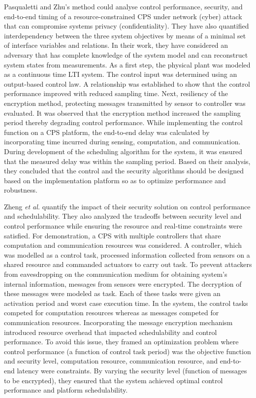 Pasqualetti and Zhu's \cite{PZ15} method could analyse control performance, security, and end-to-end timing of a resource-constrained CPS under network (cyber) attack that can compromise systems privacy (confidentiality). They have also quantified interdependency between the three system objectives by means of a minimal set of interface variables and relations. In their work, they have considered an adversary that has complete knowledge of the system model and can reconstruct system states from measurements. As a first step, the physical plant was modeled as a continuous time LTI system. The control input was determined using an output-based control law. A relationship was established to show that the control performance improved with reduced sampling time. Next, resiliency of the encryption method, protecting messages transmitted by sensor to controller was evaluated. It was observed that the encryption method increased the sampling period thereby degrading control performance. While implementing the control function on a CPS platform, the end-to-end delay was calculated by incorporating time incurred during sensing, computation, and communication. During development of the scheduling algorithm for the system, it was ensured that the measured delay was within the sampling period. Based on their analysis, they concluded that the control and the security algorithms should be designed based on the implementation platform so as to optimize performance and robustness. 

Zheng \textit{et al.} \cite{ZDRP16} quantify the impact of their security solution on control performance and schedulability. They also analyzed the tradeoffs between security level and control performance while ensuring the resource and real-time constraints were satisfied. For demonstration, a CPS with multiple controllers that share computation and communication resources was considered. A controller, which was modelled as a control task, processed information collected from sensors on a shared resource and commanded actuators to carry out task. To prevent attackers from eavesdropping on the communication medium for obtaining system's internal information, messages from sensors were encrypted. The decryption of these messages were modeled as task. Each of these tasks were given an activation period and worst case execution time. In the system, the control tasks competed for computation resources whereas as messages competed for communication resources. Incorporating the message encryption mechanism introduced resource overhead that impacted schedulability and control performance. To avoid this issue, they framed an optimization problem where control performance (a function of control task period) was the objective function and security level, computation resource, communication resource, and end-to-end latency were constraints. By varying the security level (function of messages to be encrypted), they ensured that the system achieved optimal control performance and platform schedulability. 

